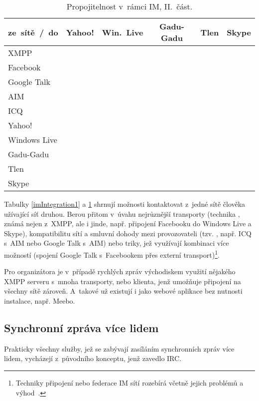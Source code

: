 \documentclass[12pt,oneside,final]{fithesis2}
\newcommand{\yes}{\scriptsize{\Checkmark}}
\newcommand{\no}{\scriptsize{\XSolidBrush}}
\begin{document}
\begin{table}[ht]
    \centering
    \begin{tabular}{ l | c c c c c }
        ze~sítě~/~do & Yahoo! & Win.~Live & Gadu-Gadu & Tlen & Skype \\
        \hline
        XMPP         & \yes & \yes & \yes & \yes & \yes  \\
        Facebook     & \no  & \no  & \no  & \no  & \no  \\
        Google Talk  & \yes & \yes & \yes & \yes & \yes \\
        AIM          & \no  & \no  & \no  & \no  & \no  \\
        ICQ          & \no  & \no  & \no  & \no  & \no  \\
        Yahoo!       & \yes & \yes & \no  & \no  & \no  \\
        Windows Live & \yes & \yes & \no  & \no  & \no  \\
        Gadu-Gadu    & \yes & \yes & \yes & \yes & \no  \\
        Tlen         & \no  & \no  & \yes & \yes & \no  \\
        Skype        & \no  & \no  & \no  & \no  & \yes \\
    \end{tabular}
    \caption{Propojitelnost v~rámci IM, II.~část.}
    \label{imIntegration2}
\end{table}

Tabulky \ref{imIntegration1} a \ref{imIntegration2} shrnují možnosti kontaktovat z~jedné sítě člověka užívající síť druhou. Berou přitom v~úvahu nejrůznější transporty (technika , známá nejen z~XMPP, ale i jinde, např. připojení Facebooku do Windows Live a Skype), kompatibilitu sítí a smluvní dohody mezi provozovateli (tzv. , např. ICQ s~AIM nebo Google Talk s~AIM) nebo triky, jež využívají kombinaci více možností (spojení Google Talk s~Facebookem přes externí transport)\footnote{Techniky připojení nebo federace IM sítí rozebírá včetně jejich problémů a výhod~\cite{kunins2010betting}.}.

Pro organizátora je v~případě rychlých zpráv východiskem využití nějakého XMPP serveru s~mnoha transporty, nebo klienta, jenž umožňuje připojení na všech\-ny sítě zároveň. A~takové už existují i jako webové aplikace bez nutnosti instalace, např. Meebo.

\subsection{Synchronní zpráva více lidem}
Prakticky všechny služby, jež se zabývají zasíláním synchronních zpráv více lidem, vycházejí z~původního konceptu, jenž zavedlo IRC.
\end{document}
